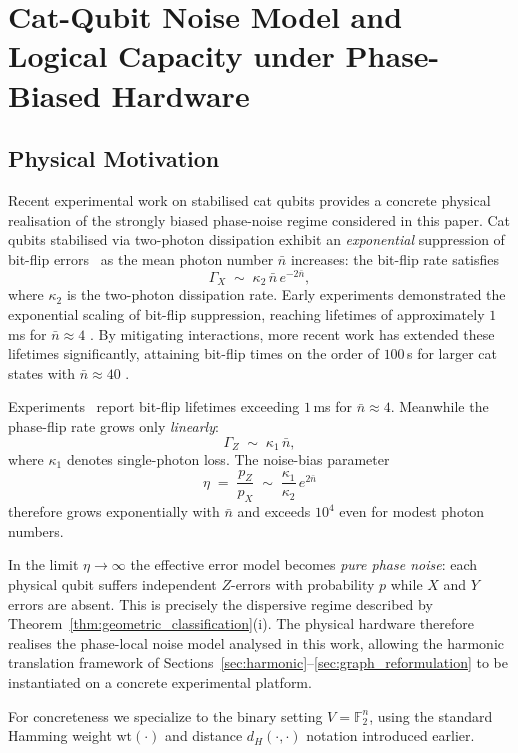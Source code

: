 \documentclass[a4paper,twocolumn,11pt,allowtoday]{quantumarticle}
\theoremstyle{plain}
\theoremstyle{definition}
\theoremstyle{remark}
\begin{document}
\section{Cat-Qubit Noise Model and Logical Capacity under Phase-Biased Hardware}
\label{sec:catqubit}


\subsection{Physical Motivation}
\label{subsec:catqubit_motivation}

Recent experimental work on stabilised cat qubits provides a concrete
physical realisation of the strongly biased phase-noise regime
considered in this paper. Cat qubits stabilised via two-photon
dissipation exhibit an \emph{exponential} suppression of bit-flip
errors~\cite{GuillaudMirrahimi2019,Puri2020} as the mean photon number $\bar{n}$ increases: the bit-flip
rate satisfies
\[
   \Gamma_X \;\sim\; \kappa_2\,\bar{n}\,e^{-2\bar{n}},
\]
where $\kappa_2$ is the two-photon dissipation rate.
Early experiments demonstrated the exponential scaling of bit-flip suppression, reaching lifetimes of approximately $1$\,ms for $\bar{n} \approx 4$ \cite{Lescanne2020}. 
By mitigating interactions, more recent work has extended these 
lifetimes significantly, attaining bit-flip times on the order of $100$\,s 
for larger cat states with $\bar{n} \approx 40$ \cite{Berdou2023}.


Experiments~\cite{Lescanne2020} report bit-flip lifetimes exceeding $1$\,ms for
$\bar{n}\approx 4$.
Meanwhile the phase-flip rate grows only \emph{linearly}:
\[
   \Gamma_Z \;\sim\; \kappa_1\,\bar{n},
\]
where $\kappa_1$ denotes single-photon loss. The noise-bias parameter
\[
   \eta \;=\; \frac{p_Z}{p_X}
     \;\sim\; \frac{\kappa_1}{\kappa_2}\,e^{2\bar{n}}
\]
therefore grows exponentially with $\bar{n}$ and exceeds $10^{4}$
even for modest photon numbers.

In the limit $\eta\to\infty$ the effective error model becomes
\emph{pure phase noise}: each physical qubit suffers independent
$Z$-errors with probability $p$ while $X$ and $Y$ errors are
absent. This is precisely the dispersive regime described by
Theorem~\ref{thm:geometric_classification}(i). The physical hardware therefore realises the phase-local noise model analysed in this work, allowing the harmonic translation framework of Sections~\ref{sec:harmonic}--\ref{sec:graph_reformulation} to be instantiated on a concrete experimental platform.


For concreteness we specialize to the binary setting $V=\mathbb{F}_2^n$, using the standard Hamming weight $\mathrm{wt}(\cdot)$ and distance $d_H(\cdot,\cdot)$ notation introduced earlier.
\end{document}
